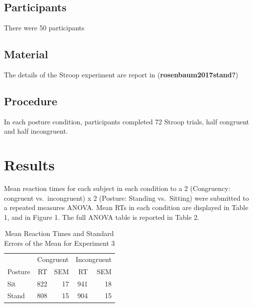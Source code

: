 \documentclass[
  english,
  man]{article}
\begin{document}
\hypertarget{participants}{%
\subsection{Participants}\label{participants}}

There were 50 participants

\hypertarget{material}{%
\subsection{Material}\label{material}}

The details of the Stroop experiment are report in (\textbf{rosenbaum2017stand?})

\hypertarget{procedure}{%
\subsection{Procedure}\label{procedure}}

In each posture condition, participants completed 72 Stroop trials, half congruent and half incongruent.

\hypertarget{results}{%
\section{Results}\label{results}}

Mean reaction times for each subject in each condition to a 2 (Congruency: congruent vs.~incongruent) x 2 (Posture: Standing vs.~Sitting) were submitted to a repeated measures ANOVA. Mean RTs in each condition are displayed in Table 1, and in Figure 1. The full ANOVA table is reported in Table 2.

\begin{table}

\caption{\label{tab:unnamed-chunk-2}Mean Reaction Times and Standard Errors of the Mean for Experiment 3}
\centering
\begin{tabular}[t]{lrrrr}
\toprule
\multicolumn{1}{c}{ } & \multicolumn{2}{c}{Congruent} & \multicolumn{2}{c}{Incongruent} \\
\cmidrule(l{3pt}r{3pt}){2-3} \cmidrule(l{3pt}r{3pt}){4-5}
Posture & RT & SEM & RT & SEM\\
\midrule
Sit & 822 & 17 & 941 & 18\\
Stand & 808 & 15 & 904 & 15\\
\bottomrule
\end{tabular}
\end{table}
\end{document}
